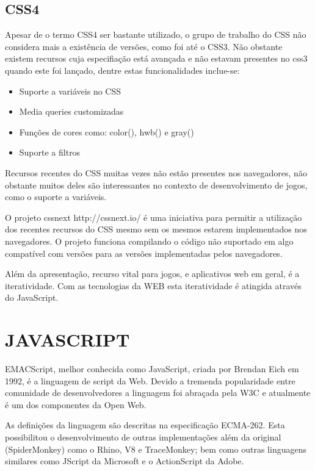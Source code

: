 \subsection{CSS4}

Apesar de o termo CSS4 ser bastante utilizado, o grupo de trabalho do CSS
não considera mais a existência de versões, como foi até o CSS3.
Não obstante existem recursos cuja especifiação está avançada e não estavam presentes
no css3 quando este foi lançado, dentre estas funcionalidades inclue-se:

\begin{itemize}
\item Suporte a variáveis no CSS
\item Media queries customizadas
\item Funções de cores como: color(), hwb() e gray()
\item Suporte a filtros
\end{itemize}

Recursos recentes do CSS muitas vezes não estão presentes nos
navegadores, não obstante muitos deles são interessantes no contexto
de desenvolvimento de jogos, como o suporte a variáveis.

O projeto cssnext http://cssnext.io/ é uma iniciativa para permitir a
utilização dos recentes recursos do CSS mesmo sem os mesmos estarem
implementados nos navegadores. O projeto funciona compilando o código
não suportado em algo compatível com versões para as versões
implementadas pelos navegadores.

Além da apresentação, recurso vital para jogos, e aplicativos web em
geral, é a iteratividade. Com as tecnologias da WEB esta iteratividade
é atingida através do JavaScript.
\section{JAVASCRIPT}

EMACScript, melhor conhecida como JavaScript, criada por Brendan Eich em
1992, é a linguagem de script da Web. Devido a tremenda popularidade
entre comunidade de desenvolvedores a linguagem foi abraçada pela W3C e
atualmente é um dos componentes da Open Web.

As definições da linguagem são descritas na especificação ECMA-262.
Esta possibilitou o desenvolvimento de outras implementações além da
original (SpiderMonkey) como o Rhino, V8 e TraceMonkey; bem como
outras linguagens similares como JScript da Microsoft e o ActionScript
da Adobe.

